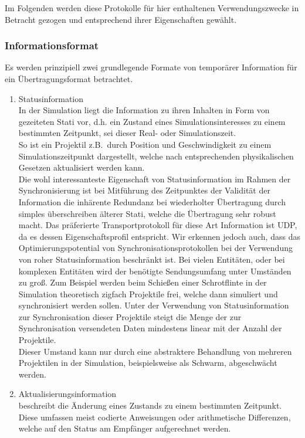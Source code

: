 \documentclass[11pt,twoside,a4paper]{article}
\begin{document}
Im Folgenden werden diese Protokolle für hier enthaltenen Verwendungszwecke in Betracht gezogen und entsprechend ihrer Eigenschaften gewählt.

\subsubsection{Informationsformat}

Es werden prinzipiell zwei grundlegende Formate von temporärer Information für ein Übertragungsformat betrachtet.
\begin{enumerate}
\item Statusinformation\\
In der Simulation liegt die Information zu ihren Inhalten in Form von gezeiteten Stati vor, d.h. ein Zustand eines Simulationsinteresses zu einem bestimmten Zeitpunkt, sei dieser Real- oder Simulationszeit. \\
So ist ein Projektil z.B.~durch Position und Geschwindigkeit zu einem Simulationszeitpunkt dargestellt, welche nach entsprechenden physikalischen Gesetzen aktualisiert werden kann.\\
Die wohl interessanteste Eigenschaft von Statusinformation im Rahmen der Synchronisierung ist bei Mitführung des Zeitpunktes der Validität der Information die inhärente Redundanz bei wiederholter Übertragung durch simples überschreiben älterer Stati, welche die Übertragung sehr robust macht.
Das präferierte Transportprotokoll für diese Art Information ist UDP, da es dessen Eigenschaftsprofil entspricht.
Wir erkennen jedoch auch, dass das Optimierungspotential von Synchronisationsprotokollen bei der Verwendung von roher Statusinformation beschränkt ist. Bei vielen Entitäten, oder bei komplexen Entitäten wird der benötigte Sendungsumfang unter Umständen zu groß.
Zum Beispiel werden beim Schießen einer Schrotflinte in der Simulation theoretisch zigfach Projektile frei, welche dann simuliert und synchronisiert werden sollen.
Unter der Verwendung von Statusinformation zur Synchronisation dieser Projektile steigt die Menge der zur Synchronisation versendeten Daten mindestens linear mit der Anzahl der Projektile.\\
Dieser Umstand kann nur durch eine abstraktere Behandlung von mehreren Projektilen in der Simulation, beispielsweise als Schwarm, abgeschwächt werden.
\item Aktualisierungsinformation\\
beschreibt die Änderung eines Zustands zu einem bestimmten Zeitpunkt. Diese umfassen meist codierte Anweisungen oder arithmetische Differenzen, welche auf den Status am Empfänger aufgerechnet werden.\\

\end{enumerate}
\end{document}
